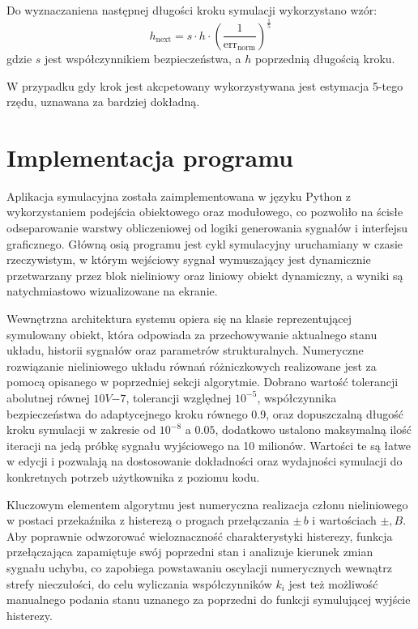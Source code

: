 \documentclass[a4paper]{article}
\begin{document}
Do wyznaczaniena następnej długości kroku symulacji wykorzystano wzór:
\begin{equation*}
    h_{\text{next}} = s \cdot h \cdot (\frac{1}{\text{err}_{\text{norm}}})^{\frac{1}{5}}
\end{equation*}
gdzie $s$ jest współczynnikiem bezpieczeństwa, a $h$ poprzednią długością kroku.

W przypadku gdy krok jest akcpetowany wykorzystywana jest estymacja 5-tego rzędu, uznawana za bardziej dokładną.

\section{Implementacja programu}
Aplikacja symulacyjna została zaimplementowana w języku Python z wykorzystaniem podejścia obiektowego oraz modułowego, co pozwoliło na ścisłe odseparowanie warstwy obliczeniowej od logiki
generowania sygnałów i interfejsu graficznego. Główną osią programu jest cykl symulacyjny uruchamiany w czasie rzeczywistym, w którym wejściowy sygnał wymuszający jest dynamicznie przetwarzany
przez blok nieliniowy oraz liniowy obiekt dynamiczny, a wyniki są natychmiastowo wizualizowane na ekranie.

Wewnętrzna architektura systemu opiera się na klasie reprezentującej symulowany obiekt, która odpowiada za przechowywanie aktualnego stanu układu, historii sygnałów oraz parametrów strukturalnych. Numeryczne
rozwiązanie nieliniowego układu równań różniczkowych realizowane jest za pomocą opisanego w poprzedniej sekcji algorytmie. Dobrano wartość tolerancji abolutnej równej $10V{-7}$, tolerancji względnej $10^{-5}$,
współczynnika bezpieczeństwa do adaptycejnego kroku równego 0.9, oraz dopuszczalną długość kroku symulacji w zakresie od $10^{-8}$ a $0.05$, dodatkowo ustalono maksymalną ilość iteracji na jedą próbkę sygnału
wyjściowego na 10 milionów. Wartości te są łatwe w edycji i pozwalają na dostosowanie dokładności oraz wydajności symulacji do konkretnych potrzeb użytkownika z poziomu kodu.

Kluczowym elementem algorytmu jest numeryczna realizacja członu nieliniowego w postaci przekaźnika z histerezą o progach przełączania $\pm\,b$ i wartościach $\pm,B$. Aby poprawnie odwzorować wieloznaczność charakterystyki
histerezy, funkcja przełączająca zapamiętuje swój poprzedni stan i analizuje kierunek zmian sygnału uchybu, co zapobiega powstawaniu oscylacji numerycznych wewnątrz strefy nieczułości, do celu wyliczania współczynników
$k_i$ jest też możliwość manualnego podania stanu uznanego za poprzedni do funkcji symulującej wyjście histerezy.
\end{document}
